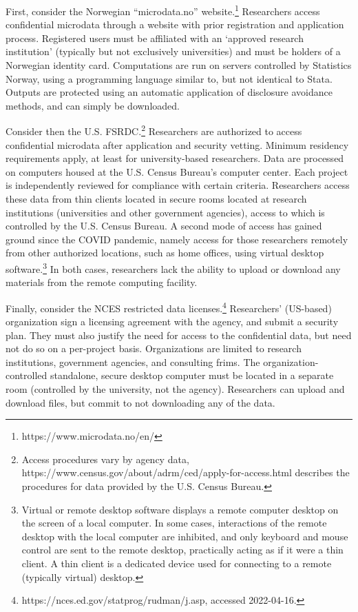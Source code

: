 First, consider the Norwegian ``microdata.no'' website.\footnote{{https://www.microdata.no/en/}} Researchers access confidential microdata through a website with prior registration and application process. Registered users must be affiliated with an `approved research institution' (typically but not exclusively universities) and must be holders of a Norwegian identity card. Computations are run on servers controlled by Statistics Norway, using a programming language similar to, but not identical to Stata. Outputs are protected using an automatic application of disclosure avoidance methods, and can simply be downloaded. 


Consider then the U.S. \ac{FSRDC}.\footnote{Access procedures vary by agency data, https://www.census.gov/about/adrm/ced/apply-for-access.html describes the procedures for data provided by the U.S. Census Bureau.} Researchers are authorized to access confidential microdata after application and security vetting. Minimum residency requirements apply, at least for university-based researchers. Data are processed on computers housed at the U.S. Census Bureau's computer center. Each project is independently reviewed for compliance with certain criteria. Researchers access these data from thin clients located in secure rooms located at research institutions (universities and other government agencies), access to which is controlled by the U.S. Census Bureau. A second mode of access has gained ground since the COVID pandemic, namely access for those researchers remotely from other authorized locations, such as home offices, using virtual desktop software.\footnote{Virtual or remote desktop software displays a remote computer desktop on the screen of a local computer. In some cases, interactions of the remote desktop with the local computer are inhibited, and only keyboard and mouse control are sent to the remote desktop, practically acting as if it were a thin client.  A thin client is a dedicated device used for connecting to a remote (typically virtual) desktop.} In both cases, researchers lack the ability to upload or download any materials from the remote computing facility. 

Finally, consider the \ac{NCES} restricted data licenses.\footnote{https://nces.ed.gov/statprog/rudman/j.asp, accessed 2022-04-16.} Researchers' (US-based) organization sign a licensing agreement with the agency, and submit a security plan. They must also justify the need for access to the confidential data, but need not do so on a per-project basis. Organizations are limited to research institutions, government agencies, and consulting frims. The organization-controlled standalone, secure desktop computer must be located in a separate room (controlled by the university, not the agency). Researchers can upload and download files, but commit to not downloading any of the data. 

